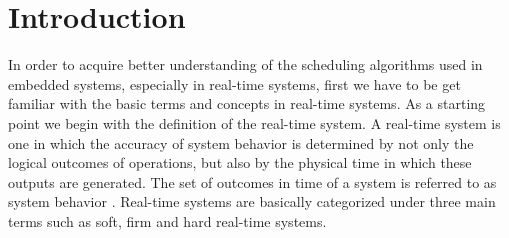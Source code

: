 \documentclass[conference]{IEEEtran}
\begin{document}
















%
%
%
\section{Introduction}
In order to acquire better understanding of the scheduling algorithms used in embedded systems, especially in real-time systems, first we have to be get familiar with the basic terms and concepts in real-time systems. As a starting point we begin with the definition of the real-time system. A real-time system is one in which the accuracy of system behavior is determined by not only the logical outcomes of operations, but also by the physical time in which these outputs are generated. The set of outcomes in time of a system is referred to as system behavior \cite{rts}. Real-time systems are basically categorized under three main terms such as soft, firm and hard real-time systems. \\
\end{document}
